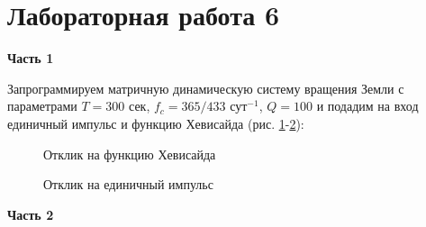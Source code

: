 \documentclass[a4paper,oneside,14pt]{extreport}
\begin{document}


\chapter*{Лабораторная работа 6}

\textbf{Часть 1}

Запрограммируем матричную динамическую систему вращения Земли с параметрами $T=300$ сек,   $f_c=365/433$ сут$^{-1}$,  $Q=100$ и подадим на вход единичный импульс и функцию Хевисайда (рис. \ref{task1_step}-\ref{task1_impulse}):

\begin{figure}[!h]
	\caption{Отклик на функцию Хевисайда}
	\label{task1_step}
\end{figure}

\begin{figure}[!h]
	\caption{Отклик на единичный импульс}
	\label{task1_impulse}
\end{figure}


\newpage
\textbf{Часть 2}
\end{document}
